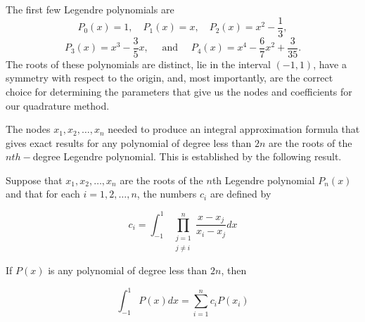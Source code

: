 The first few Legendre polynomials are
\[P_0(x)=1,\quad P_1(x)=x,\quad P_2(x)=x^2-\frac13,\]
\[P_3(x)=x^3-\frac35x,\quad\mbox{ and } \quad P_4(x)=x^4-\frac67x^2+ \frac{3}{35}.\]
 The roots of these polynomials are distinct, lie in the interval $(-1,1)$, have a symmetry with respect to the origin, and, most importantly, are the correct choice for determining the parameters that give us the nodes and coefficients for our quadrature method.

The nodes $x_1, x_2, \ldots, x_n$ needed to produce an integral approximation formula that gives exact results for any polynomial of degree less than $2n$ are the roots of the $nth-$degree Legendre polynomial. This is established by the following result.

\begin{theorem}\label{thm:Legendpolythm1}
Suppose that $x_{1}, x_{2}, \ldots, x_{n}$ are the roots of the $n$th Legendre polynomial $P_{n}(x)$ and that for each $i=1,2, \ldots, n$, the numbers $c_{i}$ are defined by

$$
c_{i}=\int_{-1}^{1} \prod_{\substack{j=1 \\ j \neq i}}^{n} \frac{x-x_{j}}{x_{i}-x_{j}} d x
$$

If $P(x)$ is any polynomial of degree less than $2 n$, then

$$
\int_{-1}^{1} P(x) d x=\sum_{i=1}^{n} c_{i} P\left(x_{i}\right)
$$
\end{theorem}
%
%
%
%
